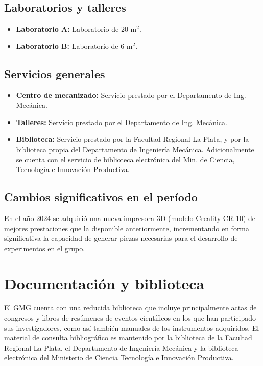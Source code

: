 \documentclass[a4paper,11pt,twoside,final,titlepage,onecolumn,openright]{report}
\begin{document}
\subsection{Laboratorios y talleres}

\begin{itemize}
 \item {\bf Laboratorio A:} Laboratorio de 20 m$^2$.
 \item {\bf Laboratorio B:} Laboratorio de 6 m$^2$.
\end{itemize}

\subsection{Servicios generales}

\begin{itemize}
 \item {\bf Centro de mecanizado:} Servicio prestado por el Departamento de Ing. Mecánica.
 \item {\bf Talleres:} Servicio prestado por el Departamento de Ing. Mecánica.
 \item {\bf Biblioteca:} Servicio prestado por la Facultad Regional La Plata, y por la biblioteca propia del Departamento de Ingeniería Mecánica. Adicionalmente se cuenta con el servicio de biblioteca electrónica del Min. de Ciencia, Tecnología e Innovación Productiva. 
\end{itemize}

\subsection{Cambios significativos en el período}
En el año 2024 se adquirió una nueva impresora 3D (modelo Creality CR-10) de mejores prestaciones que la disponible anteriormente, incrementando en forma significativa la capacidad de generar piezas necesarias para el desarrollo de experimentos en el grupo. 

\section{Documentación y biblioteca}

El GMG cuenta con una reducida biblioteca que incluye principalmente actas de congresos y libros de resúmenes de eventos científicos en los que han participado sus investigadores, como así también manuales de los instrumentos adquiridos. El material de consulta bibliográfico es mantenido por la biblioteca de la Facultad Regional La Plata, el Departamento de Ingeniería Mecánica y la biblioteca electrónica del Ministerio de Ciencia Tecnología e Innovación Productiva. 
\end{document}
